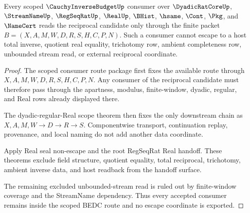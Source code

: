 \begin{theorem}
\label{thm:cauchy-inverse-budget-consumer-nonescape-scope}
Every scoped $\CauchyInverseBudgetUp$ consumer over $\DyadicRatCoreUp$, $\StreamNameUp$, $\RegSeqRatUp$, $\RealUp$, $\BHist$, $\hsame$, $\Cont$, $\Pkg$, and $\NameCert$ reads the reciprocal candidate only through the finite packet $B=(X,A,M,W,D,R,S,H,C,P,N)$. Such a consumer cannot escape to a host total inverse, quotient real equality, trichotomy row, ambient completeness row, unbounded stream read, or external reciprocal coordinate.
\end{theorem}
\begin{proof}
The scoped consumer route package first fixes the available route through $X,A,M,W,D,R,S,H,C,P,N$. Any consumer of the reciprocal candidate must therefore pass through the apartness, modulus, finite-window, dyadic, regular, and Real rows already displayed there.

The dyadic-regular-Real scope theorem then fixes the only downstream chain as $X,A,M,W \longrightarrow D \longrightarrow R \longrightarrow S$. Componentwise transport, continuation replay, provenance, and local naming do not add another data coordinate.

Apply Real seal non-escape and the root RegSeqRat Real handoff. These theorems exclude field structure, quotient equality, total reciprocal, trichotomy, ambient inverse data, and host readback from the handoff surface.

The remaining excluded unbounded-stream read is ruled out by finite-window coverage and the StreamName dependency. Thus every accepted consumer remains inside the scoped BEDC route and no escape coordinate is exported.
\end{proof}


